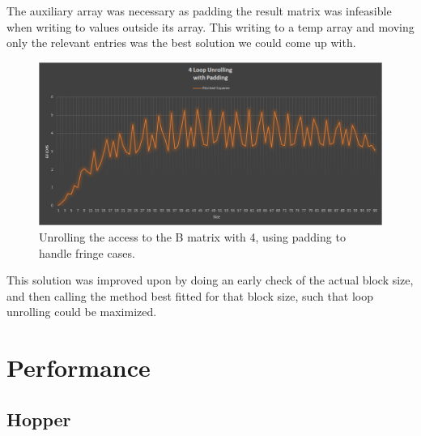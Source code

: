 \documentclass[a4paper,11pt,oneside]{book}
\begin{document}
The auxiliary array was necessary as padding the result matrix was infeasible when writing to values outside its array. This writing to a temp array and moving only the relevant entries was the best solution we could come up with.

\begin{figure}
  \centering
  \includegraphics[width=0.9\linewidth]{graph-blocked-padding.png}
  \caption{Unrolling the access to the B matrix with 4, using padding to handle fringe cases.}
  \centering
  \label{fig:sub1}
\end{figure}

This solution was improved upon by doing an early check of the actual block size, and then calling the method best fitted for that block size, such that loop unrolling could be maximized.

\chapter{Performance}





\section{Hopper}
\end{document}
